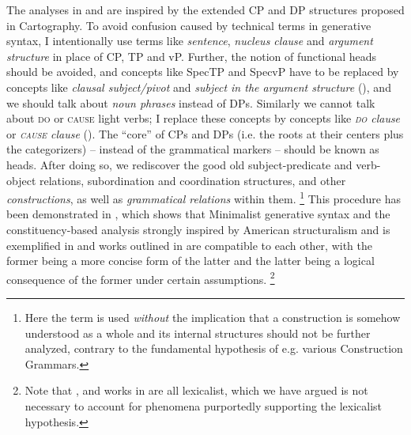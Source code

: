 \documentclass[UTF8, a4paper, oneside, scheme=plain, 12pt]{ctexrep}
\newcommand*{\term}[1]{\emph{#1}}
\newcommand*{\category}[1]{\textsc{#1}}
\begin{document}
{The analyses in  and  are inspired by the extended CP and DP structures proposed in Cartography.
To avoid confusion caused by technical terms in generative syntax,
I intentionally use terms like \term{sentence}, \term{nucleus clause} and \term{argument structure} in place of CP, TP and vP.
Further, the notion of functional heads should be avoided, and concepts like SpecTP and SpecvP have to be replaced by concepts like \term{clausal subject/pivot} and \term{subject in the argument structure} (),
and we should talk about \term{noun phrases} instead of DPs.
Similarly we cannot talk about \category{do} or \category{cause} light verbs;
I replace these concepts by concepts like \term{\category{do} clause} or \term{\category{cause} clause} ().
The ``core'' of CPs and DPs (i.e. the roots at their centers plus the categorizers) -- instead of the grammatical markers -- should be known as heads. 
After doing so, we rediscover the good old subject-predicate and verb-object relations,
subordination and coordination structures, and other \term{constructions}, as well as \term{grammatical relations} within them.%
\footnote{
    Here the term is used \emph{without} the implication 
    that a construction is somehow understood as a whole 
    and its internal structures should not be further analyzed,
    contrary to the fundamental hypothesis of e.g. various Construction Grammars.
}
This procedure has been demonstrated in \citet{deng2010},
which shows that Minimalist generative syntax and the constituency-based analysis strongly inspired by American structuralism and is exemplified in \citet{cgel} and works outlined in  are compatible to each other,
with the former being a more concise form of the latter 
and the latter being a logical consequence of the former under certain assumptions.%
\footnote{
    Note that \citet{deng2010}, \citet{cgel} and works in  are all lexicalist, which we have argued is not necessary to account for phenomena purportedly supporting the lexicalist hypothesis.
} 

}
\end{document}
